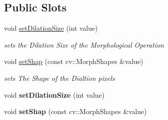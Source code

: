 \subsection*{Public Slots}
\begin{DoxyCompactItemize}
\item 
void \hyperlink{class_image_processor_1_1_dilate_addfbd49b040fc54c9a8985c764f4a144}{set\+Dilation\+Size} (int value)
\begin{DoxyCompactList}\small\item\em sets the Dilation Size of the Morphological Operation \end{DoxyCompactList}\item 
void \hyperlink{class_image_processor_1_1_dilate_a675b54d7fa85c5bce578a625a1f8ec38}{set\+Shap} (const cv\+::\+Morph\+Shapes \&value)
\begin{DoxyCompactList}\small\item\em sets The Shape of the Dialtion pixels \end{DoxyCompactList}\item 
\mbox{\label{class_image_processor_1_1_dilate_a38993d0496edc207df78bb98d37e816f}} 
void {\bfseries set\+Dilation\+Size} (int value)
\item 
\mbox{\label{class_image_processor_1_1_dilate_a244c872bec041a97fc2ef5c7ea89402e}} 
void {\bfseries set\+Shap} (const cv\+::\+Morph\+Shapes \&value)
\end{DoxyCompactItemize}
